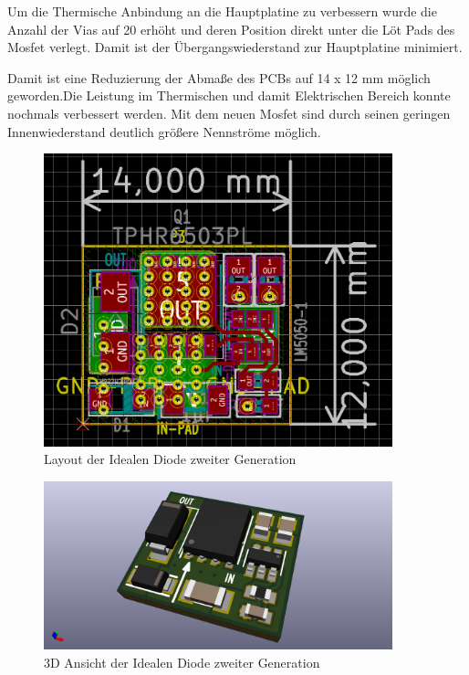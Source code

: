 Um die Thermische Anbindung an die Hauptplatine zu verbessern wurde die Anzahl der Vias auf 20 erhöht und deren Position direkt unter die Löt Pads des Mosfet verlegt. Damit ist der Übergangswiederstand zur Hauptplatine minimiert.

Damit ist eine Reduzierung der Abmaße des PCBs auf 14 x 12 mm möglich geworden.Die Leistung im Thermischen und damit Elektrischen Bereich konnte nochmals verbessert werden. Mit dem neuen Mosfet sind durch seinen geringen Innenwiederstand deutlich größere Nennströme möglich.


\begin{figure}[H]
\centering
\includegraphics[width=0.9\textwidth]{bilder/Ideale_Diode/Ideale_Diode_25V_rev00_ver00.png} 
\caption{Layout der Idealen Diode zweiter Generation} 
\label{fig:Layout der Idealen Diode zweiter Generation}
\end{figure}



\begin{figure}[H]
\centering
\includegraphics[width=0.9\textwidth]{bilder/Ideale_Diode/Ideale_Diode_25V_rev00_ver00-3D.png} 
\caption{3D Ansicht der Idealen Diode zweiter Generation} 
\label{fig:3D Ansicht der Idealen Diode zweiter Generation}
\end{figure}


